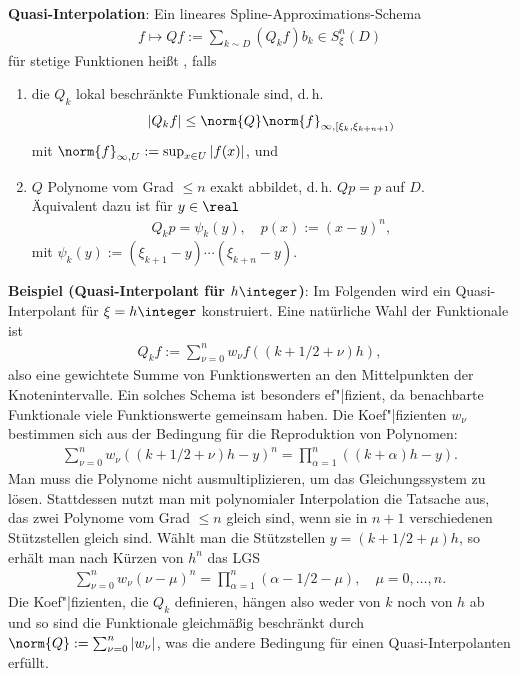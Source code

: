 \textbf{Quasi-Interpolation}:
Ein lineares Spline-Approximations-Schema
\begin{align*}
    f \mapsto Qf := \sum_{k \sim D} (Q_k f) b_k \in S_\xi^n(D)
\end{align*}
für stetige Funktionen heißt , falls
\begin{enumerate}
    \item
    die $Q_k$ lokal beschränkte Funktionale sind, d.\,h.
    \begin{align*}
        |Q_k f| \le \norm{Q} \norm{f}_{\infty, [\xi_k, \xi_{k+n+1})}
    \end{align*}
    mit $\norm{f}_{\infty, U} := \sup_{x \in U} |f(x)|$, und
    
    \item
    $Q$ Polynome vom Grad $\le n$ exakt abbildet, d.\,h. $Qp = p$ auf $D$.\\
    Äquivalent dazu ist für $y \in \real$
    \begin{align*}
        Q_k p = \psi_k(y),\quad
        p(x) := (x - y)^n,
    \end{align*}
    mit $\psi_k(y) := (\xi_{k+1} - y) \dotsm (\xi_{k+n} - y)$.
\end{enumerate}

\linie
\pagebreak

\textbf{Beispiel (Quasi-Interpolant für $h\integer$)}:
Im Folgenden wird ein Quasi-Interpolant für $\xi = h\integer$ konstruiert.
Eine natürliche Wahl der Funktionale ist
\begin{align*}
    Q_k f := \sum_{\nu=0}^n w_\nu f((k + 1/2 + \nu)h),
\end{align*}
also eine gewichtete Summe von Funktionswerten an den Mittelpunkten der Knotenintervalle.
Ein solches Schema ist besonders ef"|fizient, da benachbarte Funktionale viele Funktionswerte
gemeinsam haben.
Die Koef"|fizienten $w_\nu$ bestimmen sich aus der Bedingung für die Reproduktion von Polynomen:
\begin{align*}
    \sum_{\nu=0}^n w_\nu ((k + 1/2 + \nu)h - y)^n = \prod_{\alpha=1}^n ((k + \alpha)h - y).
\end{align*}
Man muss die Polynome nicht ausmultiplizieren, um das Gleichungssystem zu lösen.
Stattdessen nutzt man mit polynomialer Interpolation die Tatsache aus, das zwei Polynome vom
Grad $\le n$ gleich sind, wenn sie in $n + 1$ verschiedenen Stützstellen gleich sind.
Wählt man die Stützstellen $y = (k + 1/2 + \mu)h$, so erhält man nach Kürzen von $h^n$ das LGS
\begin{align*}
    \sum_{\nu=0}^n w_\nu (\nu - \mu)^n = \prod_{\alpha=1}^n (\alpha - 1/2 - \mu),\quad
    \mu = 0, \dotsc, n.
\end{align*}
Die Koef"|fizienten, die $Q_k$ definieren, hängen also weder von $k$ noch von $h$ ab und
so sind die Funktionale gleichmäßig beschränkt durch $\norm{Q} := \sum_{\nu=0}^n |w_\nu|$,
was die andere Bedingung für einen Quasi-Interpolanten erfüllt.

